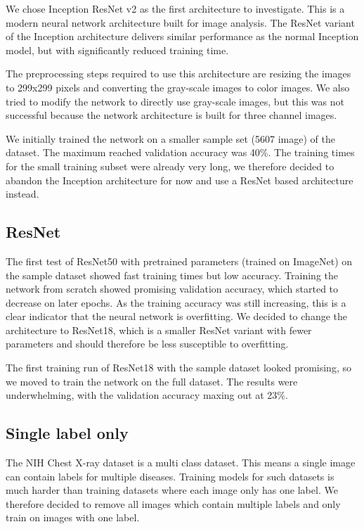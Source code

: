 We chose Inception ResNet v2 \cite{szegedy2017inception} as the first architecture to investigate. This is a modern neural network architecture built for image analysis.
The ResNet variant of the Inception architecture delivers similar performance as the normal Inception model, but with significantly reduced training time.

The preprocessing steps required to use this architecture are resizing the images to 299x299 pixels and converting the gray-scale images to color images.
We also tried to modify the network to directly use gray-scale images, but this was not successful because the network architecture is built for three channel images.

We initially trained the network on a smaller sample set (5607 image) of the dataset. The maximum reached validation accuracy was 40\%. The training times for the small training subset
were already very long, we therefore decided to abandon the Inception architecture for now and use a ResNet based architecture instead.

\subsection{ResNet}

The first test of ResNet50 \cite{he2016deep} with pretrained parameters (trained on ImageNet) on the sample dataset showed fast training times but low accuracy. Training the network from scratch showed promising validation accuracy, which started to decrease on later epochs. As the training accuracy was still increasing, this is a clear indicator that the neural network is overfitting. We decided to change the architecture to ResNet18, which is a smaller ResNet variant with fewer parameters and should therefore be less susceptible to overfitting.

The first training run of ResNet18 with the sample dataset looked promising, so we moved to train the network on the full dataset. The results were underwhelming, with the validation accuracy maxing out at 23\%.

\subsection{Single label only}
The NIH Chest X-ray dataset is a multi class dataset. This means a single image can contain labels for multiple diseases. Training models for such datasets is much harder than training datasets where each image only has one label. We therefore decided to remove all images which contain multiple labels and only train on images with one label.


